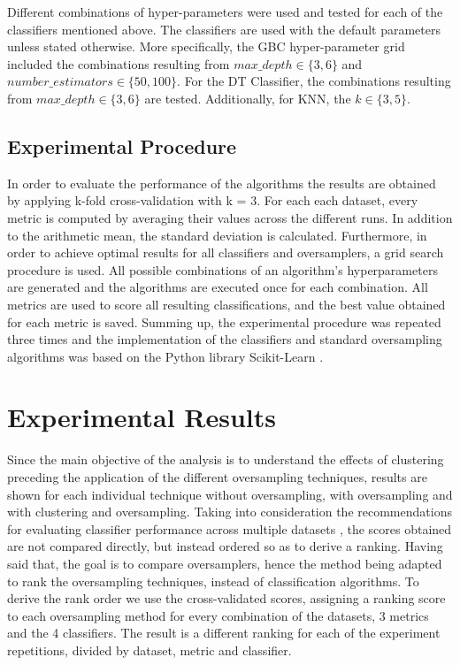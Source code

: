 \documentclass[parskip=full]{scrartcl}
\begin{document}
Different combinations of hyper-parameters were used and tested for each of the
classifiers mentioned above. The classifiers are used with the default
parameters unless stated otherwise. More specifically, the GBC hyper-parameter
grid included the combinations resulting from $max\_depth \in \{3, 6\}$ and
$number\_estimators \in \{50, 100\}$. For the DT Classifier, the combinations
resulting from $max\_depth \in \{3, 6\}$ are tested. Additionally, for KNN, the
$k \in \{3, 5\}$.

\subsection{Experimental Procedure}

In order to evaluate the performance of the algorithms the results are obtained
by applying k-fold cross-validation with k = 3. For each each dataset, every
metric is computed by averaging their values across the different runs. In
addition to the arithmetic mean, the standard deviation is calculated.
Furthermore, in order to achieve optimal results for all classifiers and
oversamplers, a grid search procedure is used. All possible combinations of an
algorithm’s hyperparameters are generated and the algorithms are executed once
for each combination. All metrics are used to score all resulting
classifications, and the best value obtained for each metric is saved. Summing
up, the experimental procedure was repeated three times and the implementation
of the classifiers and standard oversampling algorithms was based on the Python
library Scikit-Learn \cite{Pedregosa2011}.

\section{Experimental Results}

Since the main objective of the analysis is to understand the effects of
clustering preceding the application of the different oversampling techniques,
results are shown for each individual technique without oversampling, with
oversampling and with clustering and oversampling. Taking into consideration the
recommendations for evaluating classifier performance across multiple datasets
\cite{Demsar2006}, the scores obtained are not compared directly, but instead
ordered so as to derive a ranking. Having said that, the goal is to compare
oversamplers, hence the method being adapted to rank the oversampling
techniques, instead of classification algorithms. To derive the rank order we
use the cross-validated scores, assigning a ranking score to each oversampling
method for every combination of the datasets, 3 metrics and the 4 classifiers.
The result is a different ranking for each of the experiment repetitions,
divided by dataset, metric and classifier.
\end{document}
